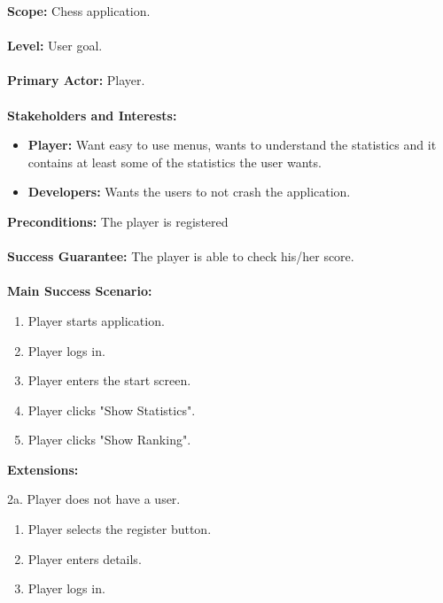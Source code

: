 \documentclass[a4paper,10pt]{article}
\begin{document}
\textbf{Scope:} Chess application.
\\\\
\textbf{Level:} User goal.
\\\\
\textbf{Primary Actor:} Player.
\\\\
\textbf{Stakeholders and Interests:}
\begin{itemize}
 \item \textbf{Player:} Want easy to use menus, wants to understand the statistics and it contains at least some of the statistics the user wants. 
 \item \textbf{Developers:} Wants the users to not crash the application.
\end{itemize}
\textbf{Preconditions:} The player is registered
\\\\
\textbf{Success Guarantee:} The player is able to check his/her score.
\\\\
\textbf{Main Success Scenario:}
\begin{enumerate}
 \item Player starts application.
 \item Player logs in.
 \item Player enters the start screen.
 \item Player clicks "Show Statistics".
 \item Player clicks "Show Ranking".
\end{enumerate}
\textbf{Extensions:}
\begin{addmargin}[1.4em]{0em}
2a. Player does not have a user.
\begin{enumerate}
 \item Player selects the register button.
 \item Player enters details.
 \item Player logs in.
\end{enumerate}
\end{addmargin}
\end{document}
